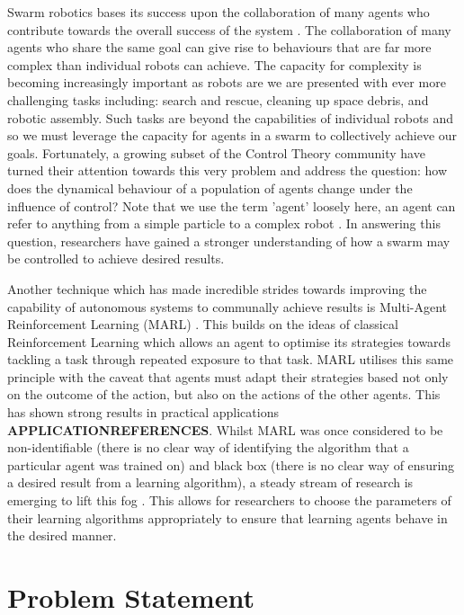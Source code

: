 \documentclass[.../main.tex]{subfiles}
\begin{document}
    Swarm robotics bases its success upon the collaboration of many agents who contribute towards
    the overall success of the system \cite{HammanFormalApproach}. The collaboration of many agents
    who share the same goal can give rise to behaviours that are far more complex than individual
    robots can achieve. The capacity for complexity is becoming increasingly important as robots are
    we are presented with ever more challenging tasks including: search and rescue, cleaning up
    space debris, and robotic assembly. Such tasks are beyond the capabilities of individual robots
    and so we must leverage the capacity for agents in a swarm to collectively achieve our
    goals. Fortunately, a growing subset of the Control Theory community have turned their attention
    towards this very problem and address the question: how does the dynamical behaviour of a
    population of agents change under the influence of control? Note that we use the term 'agent'
    loosely here, an agent can refer to anything from a simple particle \cite{BorziCollectiveMotion}
    to a complex robot \cite{ElamvazuthisThesis}. In answering this question, researchers have
    gained a stronger understanding of how a swarm may be controlled to achieve desired results.

    Another technique which has made incredible strides towards improving the capability of
    autonomous systems to communally achieve results is Multi-Agent Reinforcement Learning (MARL)
    \cite{Schwarz}. This builds on the ideas of classical Reinforcement Learning which allows an
    agent to optimise its strategies towards tackling a task through repeated exposure to that task.
    MARL utilises this same principle with the caveat that agents must adapt their strategies based
    not only on the outcome of the action, but also on the actions of the other agents. This has
    shown strong results in practical applications \textbf{APPLICATIONREFERENCES}. Whilst MARL was
    once considered to be non-identifiable (there is no clear way of identifying the algorithm that
    a particular agent was trained on) and black box (there is no clear way of ensuring a desired
    result from a learning algorithm), a steady stream of research is emerging to lift this fog
    \cite{TuylsSurvey}. This allows for researchers to choose the parameters of their learning
    algorithms appropriately to ensure that learning agents behave in the desired manner.

    \section{Problem Statement} \label{sec::Problem_Statement}
\end{document}
